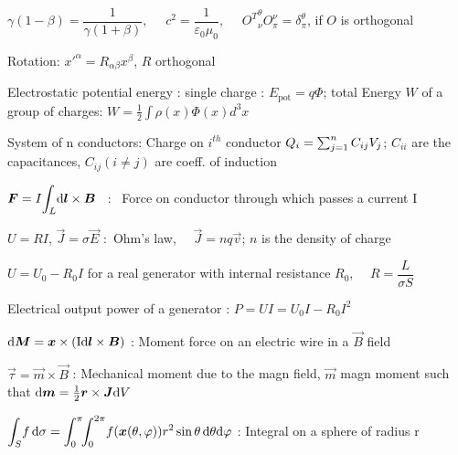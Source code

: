 \squishend


\squishlist%
\item $\gamma(1-\beta) = \dfrac{1}{\gamma(1+\beta)}, \quad  \,\, c^2 = \dfrac{1}{\varepsilon_0\mu_0}, \quad \,\, {O^T}^{\theta}_{\nu} O^{\nu}_{\pi} = \delta^{\theta}_{\pi}$, if $O$ is orthogonal
\item Rotation: $x'^\alpha=R_{\alpha \beta}x^\beta$, $R$ orthogonal

\item Electrostatic potential energy : single charge : $E_{\text{pot}} = q\Phi$; total Energy $W$ of a group of charges: $W=\frac{1}{2}\int\rho(x)\Phi(x)d^3x$

\item System of n conductors: Charge on $i^{th}$ conductor $Q_i=\sum_{\substack j=1}^nC_{ij}V_j$; $C_{ii}$ are the capacitances, $C_{ij} (i\neq j)$ are coeff. of induction 
 
\item $\mbox{\boldmath$F$} = I \displaystyle{\int_L} \mbox{\boldmath$\textrm{d} l$} \times \mbox{\boldmath$B$}$ \, : \, Force on conductor through which passes a current I

\item $U = R I$, $\vec{J} = \sigma\vec{E}$ :\, Ohm's law, $\quad \vec{J} = nq\vec{v}$; $n$ is the density of charge%

\item $U = U_0 - R_0I$ for a real generator with internal resistance $R_0$, $\quad R = \dfrac{L}{\sigma S}$ 

\item Electrical output power of a generator : $P = UI = U_0I - R_0I^2$ %

\item$\mbox{\boldmath$\textrm{d} M$} = \mbox{\boldmath$x$} \times (\rm{I}\mbox{\boldmath$\textrm{d} l$} \times \mbox{\boldmath$B$})$ : Moment force  on an electric wire in a $\vec{B}$ field

\item$\vec{\tau}=\vec{m} \times \vec{B}$ : Mechanical moment due to the magn field, $\vec{m}$ magn moment such that $\mbox{\boldmath$\textrm{d} m$}=\frac{1}{2}\mbox{\boldmath$r$} \times \mbox{\boldmath$J$} \textrm{d} V$

\item$\displaystyle{\int_{S}} f \, \textrm{d} \sigma = \displaystyle{\int_0^{\pi}} \! \displaystyle{\int_0^{2\pi}} f(\mbox{\boldmath$x$}(\theta, \varphi)) r^2\sin\theta \, \textrm{d} \theta\textrm{d} \varphi$ : Integral on a sphere of radius r

